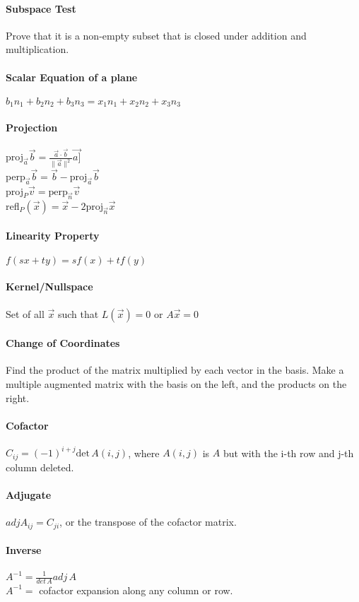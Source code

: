 \documentclass[10pt,letter]{article}
\begin{document}
\paragraph{Subspace Test} Prove that it is a non-empty subset that is closed under addition and multiplication.
\paragraph{Scalar Equation of a plane} $b_1n_1+b_2n_2+b_3n_3=x_1n_1+x_2n_2+x_3n_3$
\paragraph{Projection} proj$_{\vec{a}}\vec{b}=\frac{\vec{a}\cdot\vec{b}}{\|\vec{a}\|^2}\vec{a]}$\\ 
perp$_{\vec{a}}\vec{b}=\vec{b}-\text{proj}_{\vec{a}}\vec{b}$\\ 
proj$_P\vec{v}=\text{perp}_{\vec{n}}\vec{v}$\\ 
refl$_P(\vec{x})=\vec{x}-2\text{proj}_{\vec{n}}\vec{x}$
\paragraph{Linearity Property}$f(sx+ty)=sf(x)+tf(y)$ 
\paragraph{Kernel/Nullspace} Set of all $\vec{x}$ such that $L(\vec{x})=0$ or $A\vec{x}=0$ 
\paragraph{Change of Coordinates} Find the product of the matrix multiplied by each vector in the basis. Make a multiple augmented matrix with the basis on the left, and the products on the right. 
\paragraph{Cofactor} $C_{ij}=(-1)^{i+j}\text{det}\,A(i,j)$, where $A(i,j)$ is $A$ but with the i-th row and j-th column deleted. 
\paragraph{Adjugate} $adjA_{ij}=C_{ji}$, or the transpose of the cofactor matrix. 
\paragraph{Inverse} $A^{-1}=\frac{1}{det\,A}adj\,A$\\ 
$A^{-1}=$ cofactor expansion along any column or row. 
\end{document}
